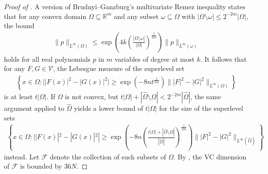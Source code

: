 \documentclass[11pt]{amsart}
\begin{document}
\begin{proof}[Proof of ]
    A version of Brudnyi--Ganzburg's multivariate Remez inequality \cite[Eq. 4.4]{Ganzburg2001} states that for any convex domain $\Omega \subseteq \mathbb R^m$ and any subset $\omega \subseteq \Omega$ with $|\Omega \setminus \omega| \leq 2^{-2m}|\Omega|$, the bound
    \begin{align*}
        \| p \|_{L^\infty(\Omega)} \leq \exp \left(4 k \left( \frac{|\Omega \setminus \omega|}{|\Omega|} \right)^{\frac1{2m}} \right) \| p \|_{L^\infty(\omega)}
    \end{align*}
    holds for all real polynomials $p$ in $m$ variables of degree at most $k$. It follows that for any $F,G \in \mathscr V$, the Lebesgue measure of the superlevel set
    \begin{align*}
        \left\{x \in \Omega: \big||F(x)|^2-|G(x)|^2\big| \geq \exp(-8 n t^{\frac1{2m}}) \| |F|^2-|G|^2 \|_{L^\infty(\Omega)} \right\}
    \end{align*}
    is at least $t |\Omega|$. If $\Omega$ is not convex, but $t|\Omega|+|\hat \Omega \setminus \Omega| < 2^{-2m} |\hat \Omega|$,  the same argument applied to $\hat \Omega$ yields a lower bound of $t|\Omega|$ for the size of the superlevel sets 
    \begin{align*}
        \left\{x \in \Omega: ||F(x)|^2-|G(x)|^2| \geq \exp\left(- 8n \left( \frac{t|\Omega|+|\hat \Omega \setminus \Omega|}{|\hat \Omega|} \right)^{\frac1{2m}}\right) \| |F|^2-|G|^2 \|_{L^\infty(\hat \Omega)} \right\}
    \end{align*}
    instead. Let $\mathcal F$ denote the collection of such subsets of $\Omega$. By , the VC dimension of $\mathcal F$ is bounded by $36 N$.


\end{proof}
\end{document}
